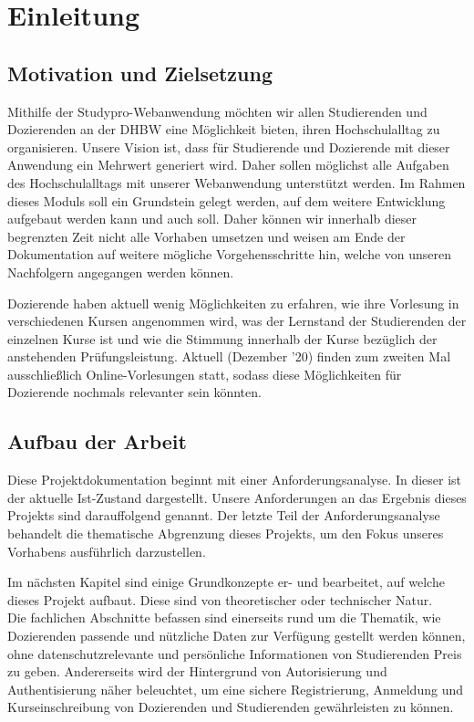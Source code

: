 \chapter{Einleitung}
\section{Motivation und Zielsetzung}

Mithilfe der Studypro-Webanwendung möchten wir allen Studierenden und Dozierenden an der DHBW eine Möglichkeit bieten, ihren Hochschulalltag zu organisieren. 
Unsere Vision ist, dass für Studierende und Dozierende mit dieser Anwendung ein Mehrwert generiert wird. Daher sollen möglichst alle Aufgaben des Hochschulalltags mit unserer Webanwendung unterstützt werden. 
Im Rahmen dieses Moduls soll ein Grundstein gelegt werden, auf dem weitere Entwicklung aufgebaut werden kann und auch soll. 
Daher können wir innerhalb dieser begrenzten Zeit nicht alle Vorhaben umsetzen und weisen am Ende der Dokumentation auf weitere mögliche Vorgehensschritte hin, welche von unseren Nachfolgern angegangen werden können.

Dozierende haben aktuell wenig Möglichkeiten zu erfahren, wie ihre Vorlesung in verschiedenen Kursen angenommen wird, was der Lernstand der Studierenden der einzelnen Kurse ist und wie die Stimmung innerhalb der Kurse bezüglich der anstehenden Prüfungsleistung. 
Aktuell (Dezember '20) finden zum zweiten Mal ausschließlich Online-Vorlesungen statt, sodass diese Möglichkeiten für Dozierende nochmals relevanter sein könnten.


\section{Aufbau der Arbeit} %

Diese Projektdokumentation beginnt mit einer Anforderungsanalyse. In dieser ist der aktuelle Ist-Zustand dargestellt.
Unsere Anforderungen an das Ergebnis dieses Projekts sind darauffolgend genannt. Der letzte Teil der Anforderungsanalyse behandelt die thematische Abgrenzung dieses Projekts, um den Fokus unseres Vorhabens ausführlich darzustellen.

Im nächsten Kapitel sind einige Grundkonzepte er- und bearbeitet, auf welche dieses Projekt aufbaut. Diese sind von theoretischer oder technischer Natur.\\
Die fachlichen Abschnitte befassen sind einerseits rund um die Thematik, wie Dozierenden passende und nützliche Daten zur Verfügung gestellt werden können, ohne datenschutzrelevante und persönliche Informationen von Studierenden Preis zu geben. 
Andererseits wird der Hintergrund von Autorisierung und Authentisierung näher beleuchtet, um eine sichere Registrierung, Anmeldung und Kurseinschreibung von Dozierenden und Studierenden gewährleisten zu können.

